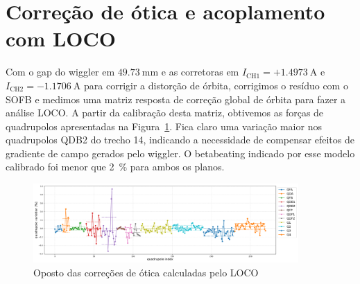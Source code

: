 \documentclass[a4paper,
               keeplastbox,   %
               ]{jacow}
\begin{document}
\section{Correção de ótica e acoplamento com LOCO}
Com o gap do wiggler em $\SI{49.73}{\milli\meter}$ e as corretoras em $I_{\mathrm{CH1}}=+\SI{1.4973}{\ampere}$ e $I_{\mathrm{CH2}}=\SI{-1.1706}{\ampere}$ para corrigir a distorção de órbita, corrigimos o resíduo com o SOFB e medimos uma matriz resposta de correção global de órbita para fazer a análise LOCO. A partir da calibração desta matriz, obtivemos as forças de quadrupolos apresentadas na Figura~\ref{fig:quad}. Fica claro uma variação maior nos quadrupolos QDB2 do trecho 14, indicando a necessidade de compensar efeitos de gradiente de campo gerados pelo wiggler. O betabeating indicado por esse modelo calibrado foi menor que \SI{2}{\percent} para ambos os planos. 
\begin{figure}
    \centering
    \includegraphics*[width=0.9\textwidth]{trimquads_correction_W180_iter0.png}
    \caption{Oposto das correções de ótica calculadas pelo LOCO}
    \label{fig:quad}
\end{figure}
\end{document}

